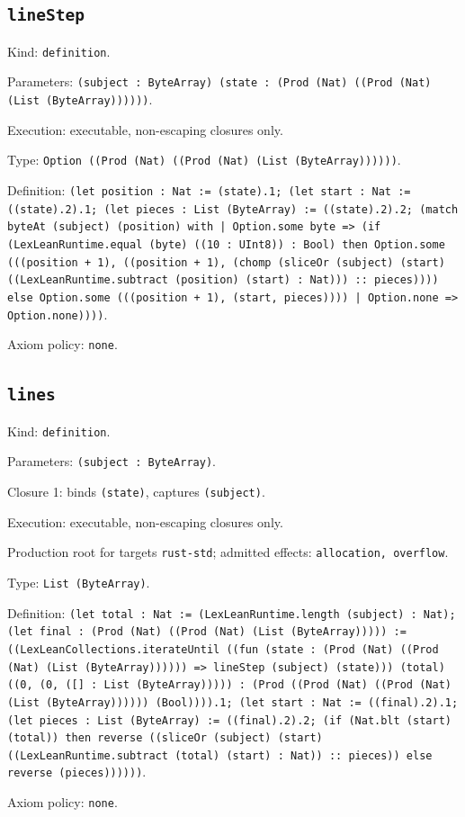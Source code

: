 \documentclass[11pt]{article}
\begin{document}
\subsection*{\texttt{lineStep}}
\noindent Kind: \texttt{definition}.\par
\noindent Parameters: \texttt{(subject : ByteArray) (state : (Prod (Nat) ((Prod (Nat) (List (ByteArray))))))}.\par
\noindent Execution: executable, non-escaping closures only.\par
\noindent Type: \texttt{Option ((Prod (Nat) ((Prod (Nat) (List (ByteArray))))))}.\par
\noindent Definition: \texttt{(let position : Nat := (state).1; (let start : Nat := ((state).2).1; (let pieces : List (ByteArray) := ((state).2).2; (match byteAt (subject) (position) with | Option.some byte => (if (LexLeanRuntime.equal (byte) ((10 : UInt8)) : Bool) then Option.some (((position + 1), ((position + 1), (chomp (sliceOr (subject) (start) ((LexLeanRuntime.subtract (position) (start) : Nat))) :: pieces)))) else Option.some (((position + 1), (start, pieces)))) | Option.none => Option.none))))}.\par
\noindent Axiom policy: \texttt{none}.\par
\subsection*{\texttt{lines}}
\noindent Kind: \texttt{definition}.\par
\noindent Parameters: \texttt{(subject : ByteArray)}.\par
\noindent Closure 1: binds \texttt{(state)}, captures \texttt{(subject)}.\par
\noindent Execution: executable, non-escaping closures only.\par
\noindent Production root for targets \texttt{rust-std}; admitted effects: \texttt{allocation, overflow}.\par
\noindent Type: \texttt{List (ByteArray)}.\par
\noindent Definition: \texttt{(let total : Nat := (LexLeanRuntime.length (subject) : Nat); (let final : (Prod (Nat) ((Prod (Nat) (List (ByteArray))))) := ((LexLeanCollections.iterateUntil ((fun (state : (Prod (Nat) ((Prod (Nat) (List (ByteArray)))))) => lineStep (subject) (state))) (total) ((0, (0, ([] : List (ByteArray))))) : (Prod ((Prod (Nat) ((Prod (Nat) (List (ByteArray)))))) (Bool)))).1; (let start : Nat := ((final).2).1; (let pieces : List (ByteArray) := ((final).2).2; (if (Nat.blt (start) (total)) then reverse ((sliceOr (subject) (start) ((LexLeanRuntime.subtract (total) (start) : Nat)) :: pieces)) else reverse (pieces))))))}.\par
\noindent Axiom policy: \texttt{none}.\par
\end{document}
